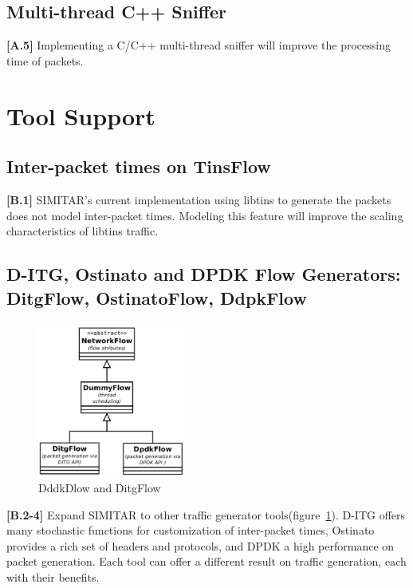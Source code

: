 \subsection{Multi-thread C++ Sniffer}

\textbf{[A.5]} Implementing a C/C++ multi-thread sniffer will improve the processing time of packets. 



\section{Tool Support}

\subsection{Inter-packet times on TinsFlow}

\textbf{[B.1]} SIMITAR’s current implementation using libtins to generate the packets does not model inter-packet times. Modeling this feature will improve the scaling characteristics of libtins traffic.

\subsection{D-ITG, Ostinato and DPDK Flow Generators: DitgFlow, OstinatoFlow, DdpkFlow}

\begin{figure}[!ht]
    \centering
    \includegraphics[height=2.0in]{figures/ch6/dpdk-flow}
    \caption{DddkDlow and DitgFlow}
    \label{fig:dpdk-flow}
\end{figure}


\textbf{[B.2-4]} Expand SIMITAR to other traffic generator tools(figure~\ref{fig:dpdk-flow}). D-ITG offers many stochastic functions for customization of inter-packet times, Ostinato provides a rich set of headers and protocols, and DPDK a high performance on packet generation. Each tool can offer a different result on traffic generation,  each with their benefits. 

